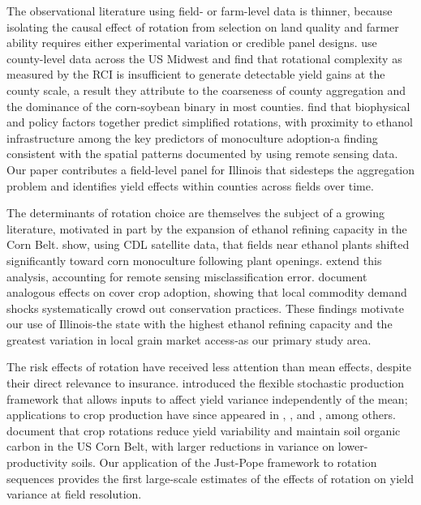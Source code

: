 \documentclass[12pt,letterpaper]{article}
\theoremstyle{remark}
\theoremstyle{remark}
\theoremstyle{plain}
\theoremstyle{definition}
\begin{document}
The observational literature using field- or farm-level data is thinner, because isolating the causal effect of rotation from selection on land quality and farmer ability requires either experimental variation or credible panel designs. \citet{burchfield2024} use county-level data across the US Midwest and find that rotational complexity as measured by the RCI is insufficient to generate detectable yield gains at the county scale, a result they attribute to the coarseness of county aggregation and the dominance of the corn-soybean binary in most counties. \citet{socolar2021} find that biophysical and policy factors together predict simplified rotations, with proximity to ethanol infrastructure among the key predictors of monoculture adoption-a finding consistent with the spatial patterns documented by \citet{pates2021} using remote sensing data. Our paper contributes a field-level panel for Illinois that sidesteps the aggregation problem and identifies yield effects within counties across fields over time.
 
The determinants of rotation choice are themselves the subject of a growing literature, motivated in part by the expansion of ethanol refining capacity in the Corn Belt. \citet{pates2021} show, using CDL satellite data, that fields near ethanol plants shifted significantly toward corn monoculture following plant openings. \citet{Pates2025} extend this analysis, accounting for remote sensing misclassification error. \citet{cheu2025} document analogous effects on cover crop adoption, showing that local commodity demand shocks systematically crowd out conservation practices. These findings motivate our use of Illinois-the state with the highest ethanol refining capacity and the greatest variation in local grain market access-as our primary study area.
 
The risk effects of rotation have received less attention than mean effects, despite their direct relevance to insurance. \citet{Just1979} introduced the flexible stochastic production framework that allows inputs to affect yield variance independently of the mean; applications to crop production have since appeared in \citet{antle1983}, \citet{shi2013}, and \citet{li2021}, among
others. \citet{wu2025} document that crop rotations reduce yield variability and maintain soil organic carbon in the US Corn Belt, with larger reductions in variance on lower-productivity soils. Our application of the Just-Pope framework to rotation sequences provides the first large-scale estimates of the effects of rotation on yield variance at field resolution.
\end{document}
